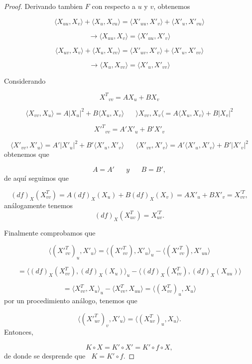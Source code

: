 \begin{proof}
	Derivando tambien $F$ con respecto a $u$ y $v$, obtenemos
	
	\[
		\langle X_{uu}, X_v \rangle + \langle X_u, X_{vu} \rangle = \langle X'_{uu}, X'_v \rangle + \langle X'_u, X'_{vu} \rangle
	\]
	
	\[
		\to \langle X_{uu}, X_v \rangle = \langle X'_{uu}, X'_v \rangle
	\]
	
	\[
		\langle X_{uv}, X_v \rangle + \langle X_u, X_{vv} \rangle = \langle X'_{uv}, X'_v \rangle + \langle X'_u, X'_{vv} \rangle
	\]
	
	\[
		\to \langle X_u, X_{vv} \rangle = \langle X'_u, X'_{vv} \rangle
	\]
	
	Considerando
	
	\[
		{X^T}_{vv} = AX_u + BX_v
	\]
	
	\[
		\langle X_{vv}, X_u \rangle = A|X_u|^2 + B \langle X_u, X_v \rangle \;\;\;\;\;\; \rangle X_{vv}, X_v \langle = A \langle X_u, X_v \rangle + B|X_v|^2
	\]
	
	\[
		{X'^T}_{vv} = A'X'_u + B'X'_v
	\]
	
	\[
		\langle X'_{vv}, X'_u \rangle = A'|X'_u|^2 + B'\langle X'_u, X'_v \rangle \;\;\;\;\;\; \langle X'_{vv}, X'_v \rangle = A' \langle X'_u, X'_v \rangle + B'|X'_v|^2
	\]
	obtenemos que
	
	\[
		A = A' \;\;\;\;\;\; y \;\;\;\;\;\; B = B',
	\]
	de aquí seguimos que
	
	\[
		(df)_X(X^{T}_{vv}) = A(df)_X(X_u) + B(df)_X(X_v) = AX'_u + BX'_v = X^{'T}_{vv},
	\]
	análogamente tenemos
	\[
		(df)_X(X^{T}_{uv}) = X^{'T}_{uv}.
	\]
	
	Finalmente comprobamos que
	
	\[
		\langle (X'^{T}_{vv})_u, X'_u \rangle = \langle (X'^{T}_{vv}), X'_u \rangle _u - \langle (X'^{T}_{vv}), X'_{uu} \rangle
	\]
	
	\[
		= \langle (df)_X(X^{T}_{vv}), (df)_X(X_u) \rangle _u - \langle (df)_X(X^{T}_{vv}), (df)_X(X_{uu}) \rangle
	\]
	
	\[
		= \langle X^{T}_{vv}, X_u \rangle _u - \langle X^{T}_{vv}, X_{uu} \rangle = \langle (X^{T}_{vv})_u, X_u \rangle
	\]
	por un procedimiento análogo, tenemos que
	
	\[
		\langle (X'^{T}_{uv})_v, X'_u \rangle = \langle (X^{T}_{uv})_u, X_u \rangle.
	\]
	${ }$\\	
	
	Entonces,
	
	\[
		K \circ X = K' \circ X' = K' \circ f \circ X,
	\]
	de donde se desprende que   $\;\; K = K' \circ f$.
	
\end{proof}
${ }$\\

